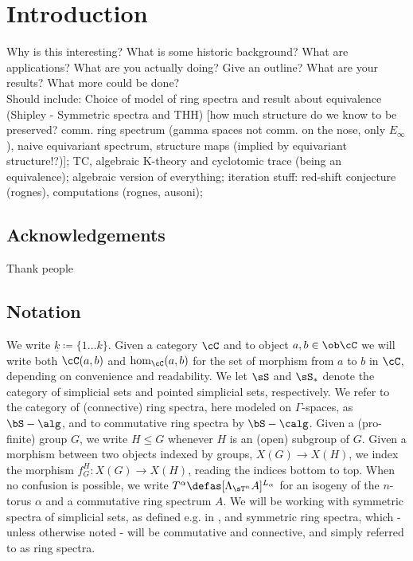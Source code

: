 \section{Introduction}
  Why is this interesting? What is some historic background? What are applications? What are you actually doing? Give an outline? What are your results? What more could be done?\\
  Should include: Choice of model of ring spectra and result about equivalence (Shipley - Symmetric spectra and THH) [how much structure do we know to be preserved? comm. ring spectrum (gamma spaces not comm. on the nose, only $E_\infty$), naive equivariant spectrum, structure maps (implied by equivariant structure!?)]; TC, algebraic K-theory and cyclotomic trace (being an equivalence); algebraic version of everything; iteration stuff: red-shift conjecture (rognes), computations (rognes, ausoni);
  \subsection{Acknowledgements}
    Thank people %
  \subsection{Notation}
    We write $\underline{k} \coloneqq \{1 \ldots k \}$.
    Given a category $\cC$ and to object $a,b \in \ob \cC$ we will write both $\cC(a,b)$ and $\hom_{\cC}(a,b)$ for the set of morphism from $a$ to $b$ in $\cC$, depending on convenience and readability.
    We let $\sS$ and $\sS_*$ denote the category of simplicial sets and pointed simplicial sets, respectively.
    We refer to the category of (connective) ring spectra, here modeled on $\Gamma$-spaces, as $\bS-\alg$, and to commutative ring spectra by $\bS-\calg$.
    Given a (pro-finite) group $G$, we write $H \leq G$ whenever $H$ is an (open) subgroup of $G$.
    Given a morphism between two objects indexed by groups, $X(G) \to X(H)$, we index the morphism $f_G^H: X(G) \to X(H)$, reading the indices bottom to top.
    When no confusion is possible, we write $T^\alpha \defas [\Lambda_{\sT^n} A]^{L_\alpha}$ for an isogeny of the $n$-torus $\alpha$ and a commutative ring spectrum $A$.
    We will be working with symmetric spectra of simplicial sets, as defined e.g. in \cite{schwede2012symmetric}, and symmetric ring spectra, which - unless otherwise noted - will be commutative and connective, and simply referred to as ring spectra.
    